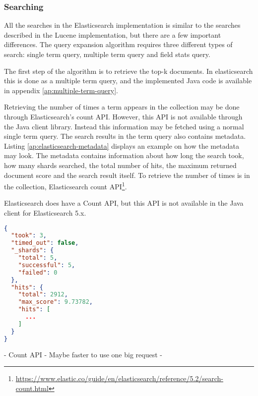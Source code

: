 \subsubsection{Searching}
All the searches in the Elasticsearch implementation is similar to the searches described in the Lucene implementation,
but there are a few important differences.
The query expansion algorithm requires three different types of search:
single term query, multiple term query and field stats query.

The first step of the algorithm is to retrieve the top-k documents.
In elasticsearch this is done as a multiple term query,
and the implemented Java code is available in appendix \ref{ap:multiple-term-query}.

Retrieving the number of times a term appears in the collection may be done through Elasticsearch's count API.
However, this API is not available through the Java client library.
Instead this information may be fetched using a normal single term query.
The search results in the term query also contains metadata.
Listing \ref{ap:elasticsearch-metadata} displays an example on how the metadata may look.
The metadata contains information about how long the search took, how many shards searched, the total number of hits,
the maximum returned document score and the search result itself.
To retrieve the number of times is in the collection, Elasticsearch count API\footnote{\url{https://www.elastic.co/guide/en/elasticsearch/reference/5.2/search-count.html}}.

Elasticsearch does have a Count API,
but this API is not available in the Java client for Elasticsearch 5.x.


\begin{lstlisting}[language={json}, caption={Example of the metadata returned by Elasticsearch.}, label={ap:elasticsearch-metadata}]
{
  "took": 3,
  "timed_out": false,
  "_shards": {
    "total": 5,
    "successful": 5,
    "failed": 0
  },
  "hits": {
    "total": 2912,
    "max_score": 9.73782,
    "hits": [
      ...
    ]
  }
}
\end{lstlisting}

- Count API
- Maybe faster to use one big request
-
